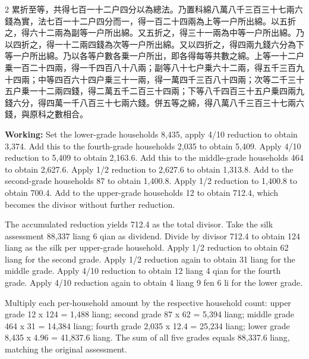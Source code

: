 \documentclass[11pt,a4paper]{article}
\newcommand{\WorkingEn}[1]{\par\noindent\textbf{Working:} #1\par}
\begin{document}
\begin{paracol}{2}
{累折至等，共得七百一十二户四分以為總法。乃置科綿八萬八千三百三十七兩六錢為實，法七百一十二户四分而一，得一百二十四兩為上等一户所出綿。以五折之，得六十二兩為副等一户所出綿。又五折之，得三十一兩為中等一户所出綿。乃以四折之，得一十二兩四錢為次等一户所出綿。又以四折之，得四兩九錢六分為下等一户所出綿。乃以各等户數各乗一户所出，即各得每等共數之綿。上等一十二户乗一百二十四兩，得一千四百八十八兩；副等八十七户乗六十二兩，得五千三百九十四兩；中等四百六十四户乗三十一兩，得一萬四千三百八十四兩；次等二千三十五户乗一十二兩四錢，得二萬五千二百三十四兩；下等八千四百三十五户乗四兩九錢六分，得四萬一千八百三十七兩六錢。併五等之綿，得八萬八千三百三十七兩六錢，與原科之數相合。}
\switchcolumn
\WorkingEn{Set the lower-grade households 8,435, apply 4/10 reduction to obtain 3,374. Add this to the fourth-grade households 2,035 to obtain 5,409. Apply 4/10 reduction to 5,409 to obtain 2,163.6. Add this to the middle-grade households 464 to obtain 2,627.6. Apply 1/2 reduction to 2,627.6 to obtain 1,313.8. Add to the second-grade households 87 to obtain 1,400.8. Apply 1/2 reduction to 1,400.8 to obtain 700.4. Add to the upper-grade households 12 to obtain 712.4, which becomes the divisor without further reduction.

The accumulated reduction yields 712.4 as the total divisor. Take the silk assessment 88,337 liang 6 qian as dividend. Divide by divisor 712.4 to obtain 124 liang as the silk per upper-grade household. Apply 1/2 reduction to obtain 62 liang for the second grade. Apply 1/2 reduction again to obtain 31 liang for the middle grade. Apply 4/10 reduction to obtain 12 liang 4 qian for the fourth grade. Apply 4/10 reduction again to obtain 4 liang 9 fen 6 li for the lower grade.

Multiply each per-household amount by the respective household count: upper grade 12 x 124 = 1,488 liang; second grade 87 x 62 = 5,394 liang; middle grade 464 x 31 = 14,384 liang; fourth grade 2,035 x 12.4 = 25,234 liang; lower grade 8,435 x 4.96 = 41,837.6 liang. The sum of all five grades equals 88,337.6 liang, matching the original assessment.}

\end{paracol}
\end{document}
